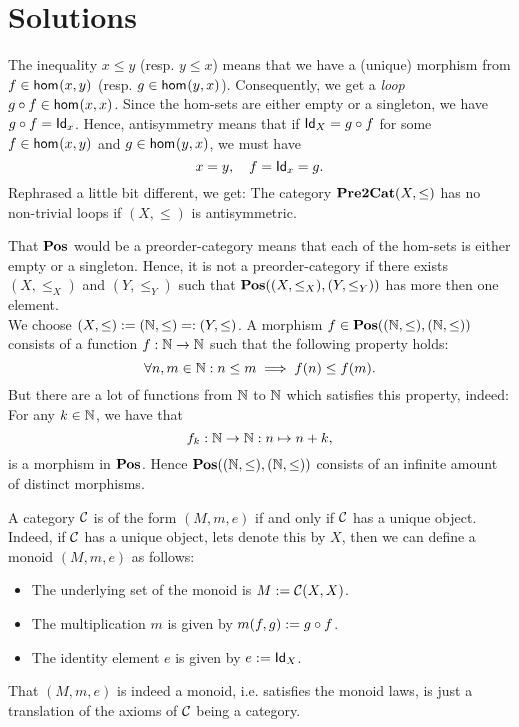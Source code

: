 \section{Solutions}
\label{sec:solutions}

\begin{solution}\label{sol:post_antisymmetry}
The inequality $x\leq y$ (resp. $y\leq x$) means that we have a (unique) morphism from $f\in \Hom{x}{y}$ (resp. $g\in \Hom{y}{x}$). Consequently, we get a \textit{loop} $\co{f}{g} \in \Hom{x}{x}$. Since the hom-sets are either empty or a singleton, we have $\co{f}{g} = \Id[x]$. Hence, antisymmetry means that if $\Id[X] = \co{f}{g}$ for some $f\in \Hom{x}{y}$ and $g\in \Hom{y}{x}$, we must have 
\[x=y,\quad f = \Id[x] = g.\]
Rephrased a little bit different, we get: The category $\PREtoCAT(X,\leq)$ has no non-trivial loops if $(X,\leq)$ is antisymmetric.
\end{solution}

\begin{solution}\label{sol:POS_isnt_a_posetcat}
That $\POS$ would be a preorder-category means that each of the hom-sets is either empty or a singleton. Hence, it is not a preorder-category if there exists $(X,\leq_X)$ and $(Y,\leq_Y)$ such that $\CHom{\POS}{(X,\leq_X)}{(Y,\leq_Y)}$ has more then one element.\\
We choose $(X,\leq) := (\NN,\leq) =: (Y,\leq)$. A morphism $f\in \CHom{\POS}{(\NN,\leq)}{(\NN,\leq)}$ consists of a function $f:\NN\to\NN$ such that the following property holds:
\[
\forall n,m\in\NN: n\leq m \implies f(n)\leq f(m).
\]
But there are a lot of functions from $\NN$ to $\NN$ which satisfies this property, indeed: For any $k\in\NN$, we have that
\[
f_k : \NN\to\NN: n\mapsto n+k,
\]
is a morphism in $\POS$. Hence $\CHom{\POS}{(\NN,\leq)}{(\NN,\leq)}$ consists of an infinite amount of distinct morphisms.
\end{solution} 

\begin{solution}\label{sol:categories_coming_from_monoids}
A category $\CC$ is of the form $(M,m,e)$ if and only if $\CC$ has a unique object. Indeed, if $\CC$ has a unique object, lets denote this by $X$, then we can define a monoid $(M,m,e)$ as follows:
\begin{itemize}
\item The underlying set of the monoid is $M := \CHom{\CC}{X}{X}$.
\item The multiplication $m$ is given by $m(f,g) := \co{f}{g}$.
\item The identity element $e$ is given by $e := \Id[X]$.
\end{itemize}
That $(M,m,e)$ is indeed a monoid, i.e. satisfies the monoid laws, is just a translation of the axioms of $\CC$ being a category.
\end{solution}

